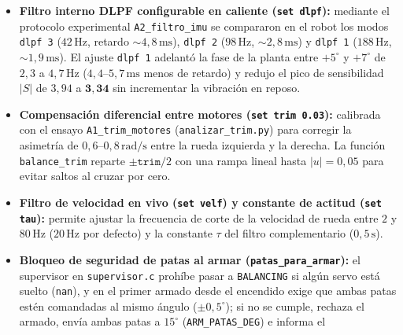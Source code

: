 \documentclass[11pt,a4paper]{report}
\newcommand{\ud}[1]{\,\mathrm{#1}}
\begin{document}
\begin{enumerate}[leftmargin=1.6em]
\begin{itemize}[leftmargin=1.4em]
            al elevar la frecuencia del bus de $100\ud{kHz}$ a $400\ud{kHz}$ (\texttt{I2C\_FREQ\_HZ}),
            la lectura de los 14 bytes de la IMU bajó de $2{,}03\ud{ms}$ a $\mathbf{0{,}89\ud{ms}}$,
            la lectura de un registro INA bajó a $\mathbf{0{,}76\ud{ms}}$ y el tiempo medio total
            de \texttt{control\_task} descendió de $3{,}26\ud{ms}$ a $\mathbf{2{,}04\ud{ms}}$
            (máximo $3{,}1\text{--}3{,}5\ud{ms}$ sobre $5{,}0\ud{ms}$ disponibles, con $0$ excesos).
      \item \textbf{Filtro interno DLPF configurable en caliente (\texttt{set dlpf}):} mediante el
            protocolo experimental \texttt{A2\_filtro\_imu} se compararon en el robot los modos
            \texttt{dlpf 3} ($42\ud{Hz}$, retardo $\sim 4{,}8\ud{ms}$), \texttt{dlpf 2} ($98\ud{Hz}$,
            $\sim 2{,}8\ud{ms}$) y \texttt{dlpf 1} ($188\ud{Hz}$, $\sim 1{,}9\ud{ms}$). El ajuste
            \texttt{dlpf 1} adelantó la fase de la planta entre $+5^\circ$ y $+7^\circ$ de $2{,}3$ a
            $4{,}7\ud{Hz}$ ($4{,}4\text{--}5{,}7\ud{ms}$ menos de retardo) y redujo el pico de
            sensibilidad $|S|$ de $3{,}94$ a $\mathbf{3{,}34}$ sin incrementar la vibración en reposo.
      \item \textbf{Compensación diferencial entre motores (\texttt{set trim 0.03}):} calibrada con
            el ensayo \texttt{A1\_trim\_motores} (\texttt{analizar\_trim.py}) para corregir la
            asimetría de $0{,}6\text{--}0{,}8\ud{rad/s}$ entre la rueda izquierda y la derecha.
            La función \texttt{balance\_trim} reparte $\pm\texttt{trim}/2$ con una rampa lineal hasta
            $|u| = 0{,}05$ para evitar saltos al cruzar por cero.
      \item \textbf{Filtro de velocidad en vivo (\texttt{set velf}) y constante de actitud (\texttt{set tau}):}
            permite ajustar la frecuencia de corte de la velocidad de rueda entre $2$ y $80\ud{Hz}$
            ($20\ud{Hz}$ por defecto) y la constante $\tau$ del filtro complementario ($0{,}5\ud{s}$).
      \item \textbf{Bloqueo de seguridad de patas al armar (\texttt{patas\_para\_armar}):} el
            supervisor en \texttt{supervisor.c} prohíbe pasar a \texttt{BALANCING} si algún servo
            está suelto (\texttt{nan}), y en el primer armado desde el encendido exige que ambas
            patas estén comandadas al mismo ángulo ($\pm 0{,}5^\circ$); si no se cumple, rechaza
            el armado, envía ambas patas a $15^\circ$ (\texttt{ARM\_PATAS\_DEG}) e informa el

\end{itemize}
\end{enumerate}
\end{document}
